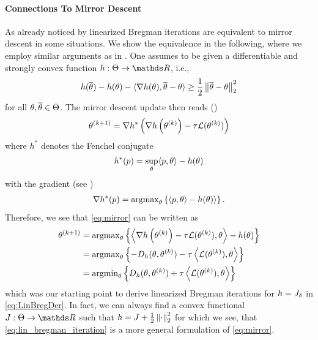 \paragraph{Connections To Mirror Descent}
As already noticed by \cite{villa2023implicit} linearized Bregman iterations are equivalent to mirror descent in some situations. We show the equivalence in the following, where we employ similar arguments as in \cite{beck2003mirror}.
%
One assumes to be given a differentiable and strongly convex function $h:\Param\to\R$, i.e.,
%
\begin{align*}
	h(\overline{\theta}) - h(\theta) - \langle\nabla h(\theta), \overline{\theta} - \theta \rangle \geq  
	\frac{1}{2} \left\|\overline{\theta} - \theta\right\|^2_2
\end{align*}
%
for all $\theta,\overline{\theta}\in\Theta$. The mirror descent update then reads (\cite{nemirovskij1983problem, beck2003mirror})
%
\begin{align}\label{eq:mirror}
	\theta^{(k+1)} = \nabla h^\ast\left(\nabla h\left(\theta^{(k)}\right) - \tau \mathcal{L}(\theta^{(k)})\right)
\end{align}
%
where $h^\ast$ denotes the Fenchel conjugate
%
\begin{align*}
	h^\ast(p) = \sup_{\theta} \langle p, \theta\rangle - h(\theta)
\end{align*}
%
with the gradient (see \cite{boyd2004convex})
%
\begin{align*}
	\nabla h^\ast(p) = \operatorname{argmax}_{\theta} \left\{ \langle p, \theta\rangle - h(\theta)\rangle\right\}.
\end{align*}
%
Therefore, we see that \cref{eq:mirror} can be written as
%
\begin{align*}
	\theta^{(k+1)} &= \operatorname{argmax}_\theta
	\left\{\left\langle\nabla h\left(\theta^{(k)}\right) - \tau \mathcal{L}(\theta^{(k)}), \theta \right\rangle - h(\theta)\right\}\\
	&=
	\operatorname{argmax}_\theta \left\{-D_h(\theta, \theta^{(k)})-\tau\left\langle \mathcal{L}(\theta^{(k)}), \theta \right\rangle\right\}\\
	&=
	\operatorname{argmin}_\theta \left\{D_h(\theta, \theta^{(k)})+\tau\left\langle \mathcal{L}(\theta^{(k)}), \theta \right\rangle\right\}
\end{align*}
%
which was our starting point to derive linearized Bregman iterations for $h=J_{\delta}$ in \cref{eq:LinBregDer}. In fact, we can always find a convex functional $\func:\Theta\to\R$ such that $h = J + \frac{1}{2}\left\|\cdot\right\|_2^2$ for which we see, that \cref{eq:lin_bregman_iteration} is a more general formulation of \cref{eq:mirror}.
%
%
